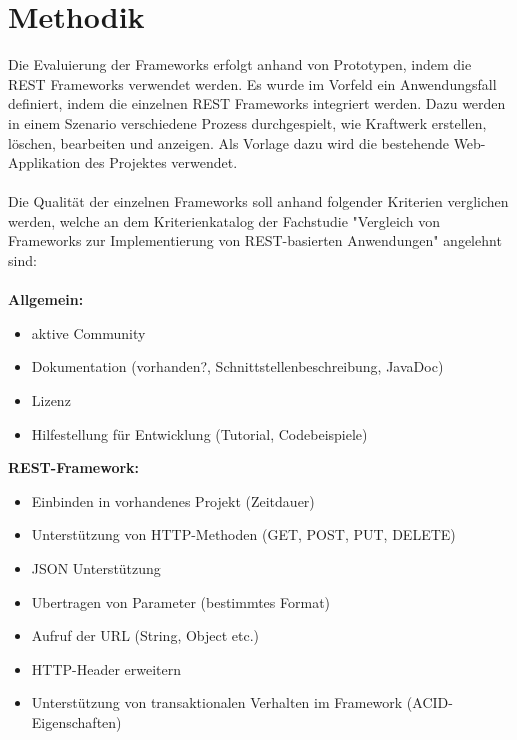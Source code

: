 \documentclass[a4paper,11pt,german,public]{INSOexpose}
\begin{document}
\section{Methodik}

Die Evaluierung der Frameworks erfolgt anhand von Prototypen, indem die REST Frameworks verwendet werden. Es wurde im Vorfeld ein Anwendungsfall definiert, indem die einzelnen REST Frameworks  integriert werden. Dazu werden in einem Szenario verschiedene Prozess durchgespielt, wie Kraftwerk erstellen, löschen, bearbeiten und anzeigen. Als Vorlage dazu wird die bestehende Web-Applikation des Projektes verwendet.
\\\\
Die Qualität der einzelnen Frameworks soll anhand folgender Kriterien verglichen werden, welche an dem Kriterienkatalog der Fachstudie "Vergleich von Frameworks zur Implementierung von REST-basierten Anwendungen" \cite{vergleich13} angelehnt sind:
\\\\
\textbf{Allgemein:}
\begin{itemize}[label=$-$]
	\item aktive Community
	\item Dokumentation (vorhanden?, Schnittstellenbeschreibung, JavaDoc)
	\item Lizenz
	\item Hilfestellung für Entwicklung (Tutorial, Codebeispiele)
\end{itemize}

\textbf{REST-Framework:}
\begin{itemize}[label=$-$]
	\item Einbinden in vorhandenes Projekt (Zeitdauer)
	\item Unterstützung von HTTP-Methoden (GET, POST, PUT, DELETE)
	\item JSON Unterstützung
	\item Ubertragen von Parameter (bestimmtes Format)
	\item Aufruf der URL (String, Object etc.)
	\item HTTP-Header erweitern
	\item Unterstützung von transaktionalen Verhalten im Framework (ACID-Eigenschaften)
\end{itemize}
\end{document}
